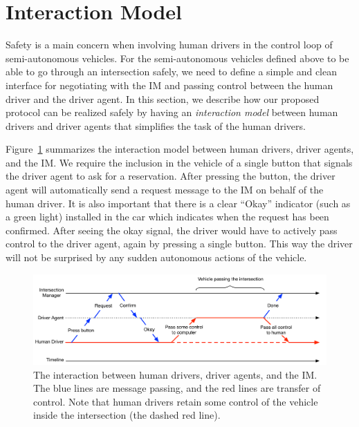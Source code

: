\section{Interaction Model}
\label{sec:interface}



Safety is a main concern when involving human drivers in the control
loop of semi-autonomous vehicles.  For the semi-autonomous vehicles
defined above to be able to go through an intersection safely, we need
to define a simple and clean interface for negotiating with the IM and
passing control between the human driver and the driver agent.  In
this section, we describe how our proposed protocol can be realized
safely by having an \emph{interaction model} between human drivers and
driver agents that simplifies the task of the human drivers.

Figure~\ref{fig:interaction} summarizes the interaction model between
human drivers, driver agents, and the IM.  We require the inclusion in
the vehicle of a single button that signals the driver agent to ask
for a reservation. After pressing the button, the driver agent will
automatically send a request message to the IM on behalf of the human
driver. It is also important that there is a clear ``Okay'' indicator
(such as a green light) installed in the car which indicates when the
request has been confirmed.  After seeing the okay signal, the driver
would have to actively pass control to the driver agent, again by
pressing a single button.  This way the driver will not be surprised
by any sudden autonomous actions of the vehicle.

\begin{figure}[t]
\centering
\includegraphics[width=5.5in]{figures/interaction}
\caption{The interaction between human drivers, driver agents, and the
IM.  The blue lines are message passing, and the red lines are
transfer of control.  Note that human drivers retain some control of the vehicle
inside the intersection (the dashed red line).}
\label{fig:interaction}
\vspace{-.1in}
\end{figure}


